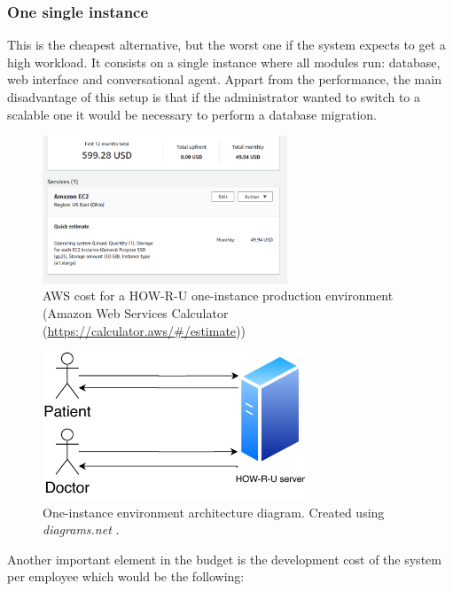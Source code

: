 \documentclass[12pt,english]{article}
\begin{document}
\subsubsection{One single instance}

This is the cheapest alternative, but the worst one if the system expects to get a high workload. It consists on a single instance where all modules run: database, web interface and conversational agent. Appart from the performance, the main disadvantage of this setup is that if the administrator wanted to switch to a scalable one it would be necessary to perform a database migration.

\begin{figure}[H]
  \centering
  \includegraphics[width=0.65\textwidth]{cost_one.png}
  \caption{AWS cost for a HOW-R-U one-instance production environment (Amazon Web Services Calculator (\href{https://calculator.aws/\#/estimate}{https://calculator.aws/\#/estimate}))}
\end{figure}

\begin{figure}[H]
  \centering
  \includegraphics[width=0.7\textwidth]{one-instance.pdf}
  \caption{One-instance environment architecture diagram. Created using \emph{diagrams.net} \protect\cite{drawio}.}
\end{figure}
\newpage

Another important element in the budget is the development cost of the system per employee which would be the following:
\end{document}
